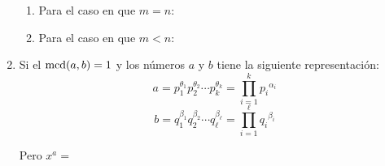 \begin{enumerate}[font={\bfseries},label={\arabic*.}]
\begin{enumerate}
		\item Para el caso en que $m=n$:
		
		\item Para el caso en que $m<n$:
	\end{enumerate}
	
	\item Si el $\operatorname{mcd}(a,b)=1$ y los números $a$ y $b$ tiene la siguiente representación:
	\[a={p}^{\theta_1}_{1}{p}^{\theta_2}_{2}\cdots{p}^{\theta_k}_{k}=\prod_{i=1}^{k}{p_i}^{\alpha_i}\]
	\[b={q}^{\beta_1}_{1}{q}^{\beta_2}_{2}\cdots{q}^{\beta_\ell}_{\ell}=\prod_{i=1}^{\ell}{q_i}^{\beta_i}\]
	
	Pero $x^{a}=$
\end{enumerate}